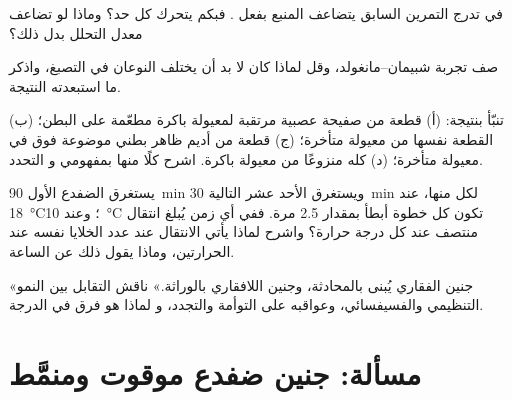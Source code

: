 \begin{exercise}[$\star\star$]\label{exo:b2:vertebrate-development:8}
في تدرج التمرين السابق يتضاعف المنبع بفعل
. فبكم يتحرك كل حد؟ وماذا لو تضاعف
معدل التحلل بدل ذلك؟
\end{exercise}

\begin{exercise}[$\star\star$]\label{exo:b2:vertebrate-development:9}
صف تجربة شبيمان--مانغولد، وقل لماذا كان لا بد أن يختلف
النوعان في التصبغ، واذكر ما استبعدته النتيجة.
\end{exercise}

\begin{exercise}[$\star\star\star$]\label{exo:b2:vertebrate-development:10}
تنبّأ بنتيجة: (أ) قطعة من صفيحة عصبية مرتقبة لمعيولة
باكرة مطعّمة على البطن؛ (ب) القطعة نفسها من معيولة
متأخرة؛ (ج) قطعة من أديم ظاهر بطني موضوعة فوق  في
معيولة متأخرة؛ (د)  كله منزوعًا من معيولة
باكرة. اشرح كلًا منها بمفهومي  و
التحدد.
\end{exercise}

\begin{exercise}[$\star\star\star$]\label{exo:b2:vertebrate-development:11}
يستغرق  الضفدع الأول \qty{90}{min} ويستغرق الأحد عشر التالية
\qty{30}{min} لكل منها، عند \qty{18}{\celsius}؛ وعند \qty{10}{\celsius} تكون كل
خطوة أبطأ بمقدار 2.5 مرة. ففي أي زمن يُبلغ انتقال منتصف
 عند كل درجة حرارة؟ واشرح لماذا يأتي الانتقال
عند عدد الخلايا نفسه عند الحرارتين، وماذا يقول ذلك
عن الساعة.
\end{exercise}

\begin{exercise}[$\star\star\star$]\label{exo:b2:vertebrate-development:12}
«جنين الفقاري يُبنى بالمحادثة، وجنين اللافقاري
بالوراثة.» ناقش التقابل بين النمو التنظيمي والفسيفسائي،
وعواقبه على التوأمة والتجدد، و
لماذا هو فرق في الدرجة.
\end{exercise}

\section{مسألة: جنين ضفدع موقوت ومنمَّط}

